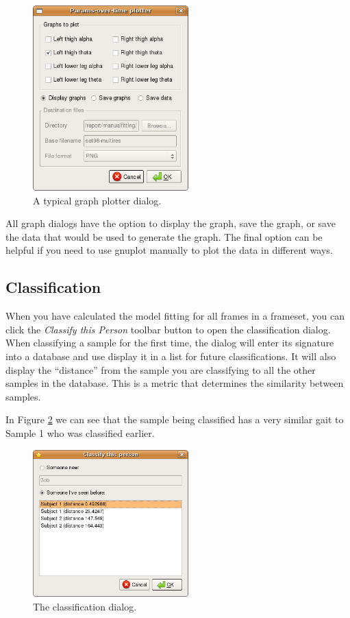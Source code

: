 \begin{figure}[htb]
	\centering
	\includegraphics[width=6cm]{manual/plotter.png}
	\caption{A typical graph plotter dialog.}
	\label{manual:plotter}
\end{figure}

All graph dialogs have the option to display the graph, save the graph, or save the data that would be used to generate the graph.
The final option can be helpful if you need to use gnuplot manually to plot the data in different ways.


\subsection{Classification}

When you have calculated the model fitting for all frames in a frameset, you can click the \emph{Classify this Person} toolbar button to open the classification dialog.
When classifying a sample for the first time, the dialog will enter its signature into a database and use display it in a list for future classifications.
It will also display the ``distance'' from the sample you are classifying to all the other samples in the database.
This is a metric that determines the similarity between samples.

In Figure \ref{manual:classify} we can see that the sample being classified has a very similar gait to Sample 1 who was classified earlier.

\begin{figure}[htb]
	\centering
	\includegraphics[width=6cm]{manual/classify.png}
	\caption{The classification dialog.}
	\label{manual:classify}
\end{figure}

